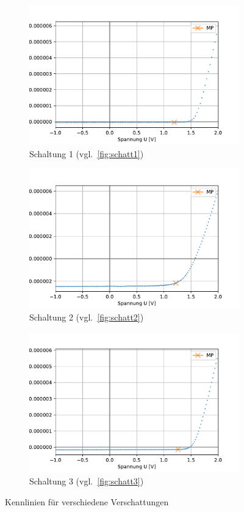 \documentclass[slug=SZ, room=Hermann-Krone-Bau\,\ Labor\ 1.25, supervisor=Martin\ Kroll]{../../Lab_Report_LaTeX/lab_report}
\begin{document}
\begin{figure}[H]\centering
	\begin{subfigure}[b]{1\textwidth}\centering
		\includegraphics[width=.5\columnwidth]{figs/python/C/3x3_verschattung_1.pdf}
		\caption{Schaltung 1 (vgl.~\ref{fig:schatt1})}
		\label{diag:verschattung1}
	\end{subfigure}
	\begin{subfigure}[b]{1\textwidth}\centering
		\includegraphics[width=.5\columnwidth]{figs/python/C/3x3_verschattung_2.pdf}
		\caption{Schaltung 2 (vgl.~\ref{fig:schatt2})}
		\label{diag:verschattung2}
	\end{subfigure}
	\begin{subfigure}[b]{1\textwidth}\centering
		\includegraphics[width=.5\columnwidth]{figs/python/C/3x3_verschattung_3.pdf}
		\caption{Schaltung 3 (vgl.~\ref{fig:schatt3})}
		\label{diag:verschattung3}
	\end{subfigure}
	\caption{Kennlinien für verschiedene Verschattungen}
	\label{fig:verschattung}
\end{figure}
\end{document}
